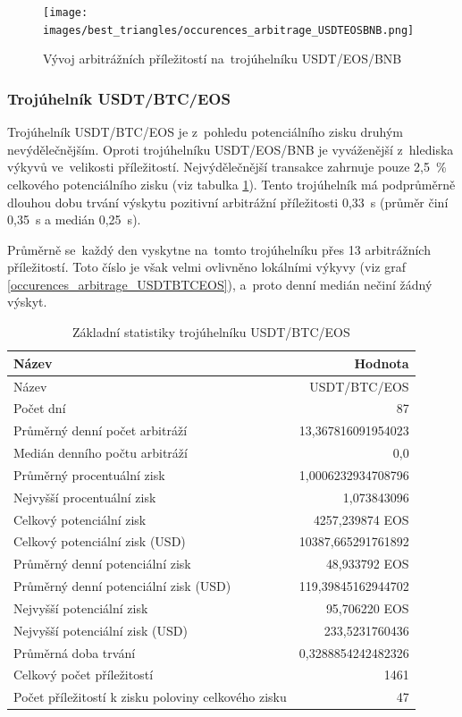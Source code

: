 \documentclass[thesis=B,czech]{FITthesis}[2019/03/21]
\begin{document}
\begin{figure}\centering
	\texttt{[image: images/best\_triangles/occurences\_arbitrage\_USDTEOSBNB.png]}
	\caption{Vývoj arbitrážních příležitostí na~trojúhelníku USDT/EOS/BNB }\label{occurences_arbitrage_USDTEOSBNB}
\end{figure}


\subsubsection{Trojúhelník USDT/BTC/EOS}
Trojúhelník USDT/BTC/EOS je z~pohledu potenciálního zisku druhým nevýdělečnějším. Oproti trojúhelníku USDT/EOS/BNB je vyváženější z~hlediska výkyvů ve~velikosti příležitostí. Nejvýdělečnější transakce zahrnuje pouze 2,5~\% celkového potenciálního zisku (viz tabulka \ref{USDTBTCEOS_stats}). Tento trojúhelník má podprůměrně dlouhou dobu trvání výskytu pozitivní arbitrážní příležitosti 0,33~s (průměr činí 0,35~s a medián 0,25~s). 

Průměrně se~každý den vyskytne na~tomto trojúhelníku přes 13 arbitrážních příležitostí. Toto číslo je však velmi ovlivněno lokálními výkyvy (viz graf \ref{occurences_arbitrage_USDTBTCEOS}), a~proto denní medián nečiní žádný výskyt.

\begin{table}\centering
\caption{Základní statistiky trojúhelníku USDT/BTC/EOS}
\label{USDTBTCEOS_stats}
\begin{tabular}{|| l | r ||}
\hline Název & Hodnota \\ 
\hline\hline Název & USDT/BTC/EOS \\ 
\hline Počet dní & 87 \\ 
\hline Průměrný denní počet arbitráží & 13,367816091954023 \\ 
\hline Medián denního počtu arbitráží & 0,0 \\ 
\hline Průměrný procentuální zisk & 1,0006232934708796 \\ 
\hline Nejvyšší procentuální zisk & 1,073843096 \\ 
\hline Celkový potenciální zisk & 4257,239874 EOS \\ 
\hline Celkový potenciální zisk (USD) & 10387,665291761892 \\ 
\hline Průměrný denní potenciální zisk & 48,933792 EOS \\ 
\hline Průměrný denní potenciální zisk (USD) & 119,39845162944702 \\ 
\hline Nejvyšší potenciální zisk & 95,706220 EOS \\ 
\hline Nejvyšší potenciální zisk (USD) & 233,5231760436 \\ 
\hline Průměrná doba trvání & 0,3288854242482326 \\ 
\hline Celkový počet příležitostí & 1461 \\ 
\hline Počet příležitostí k zisku poloviny celkového zisku & 47 \\ 
\hline
\end{tabular}
\end{table}
\end{document}
